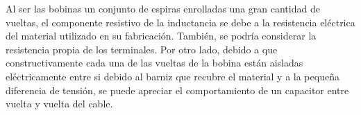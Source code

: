 Al ser las bobinas un conjunto de espiras enrolladas una gran cantidad de vueltas, el componente resistivo de la inductancia se debe a la resistencia eléctrica del material utilizado en su fabricación. También, se podría considerar la resistencia propia de los terminales.
Por otro lado, debido a que constructivamente cada una de las vueltas de la bobina están aisladas eléctricamente entre si debido al barniz que recubre el material y a la pequeña diferencia de tensión, se puede apreciar el comportamiento de un capacitor entre vuelta y vuelta del cable.
 \begin{center}
     \begin{table}[H]
     \centering
     \renewcommand{\arraystretch}{1.1}
\end{table}
\end{center}
